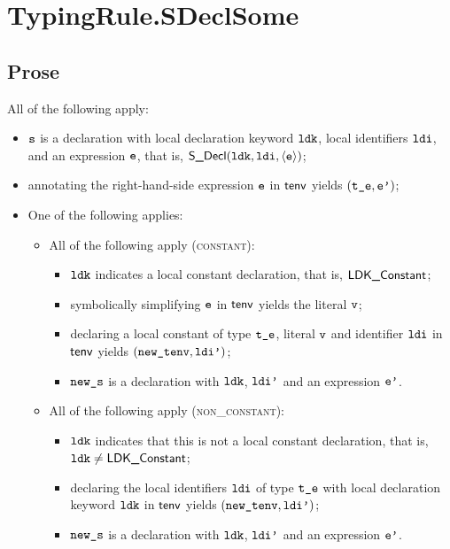 \documentclass{book}
\newcommand\ProseOrTypeError[0]{\ProseTerminateAs{\TypeErrorConfig}}
\begin{document}
\section{TypingRule.SDeclSome \label{sec:TypingRule.SDeclSome}}

\subsection{Prose}
All of the following apply:
\begin{itemize}
  \item $\texttt{s}$ is a declaration with local declaration keyword $\texttt{ldk}$, local identifiers $\texttt{ldi}$, and an expression $\texttt{e}$,
        that is, $\textsf{S\_Decl}(\texttt{ldk}, \texttt{ldi}, \langle\texttt{e}\rangle)$;
  \item annotating the right-hand-side expression $\texttt{e}$ in $\textsf{tenv}$ yields $(\texttt{t\_e},\texttt{e'})$\ProseOrTypeError;
  \item One of the following applies:
  \begin{itemize}
    \item All of the following apply (\textsc{constant}):
    \begin{itemize}
      \item $\texttt{ldk}$ indicates a local constant declaration, that is, $\textsf{LDK\_Constant}$;
      \item symbolically simplifying $\texttt{e}$ in $\textsf{tenv}$ yields the literal $\texttt{v}$\ProseOrTypeError;
      \item declaring a local constant of type $\texttt{t\_e}$, literal $\texttt{v}$ and identifier $\texttt{ldi}$ in $\textsf{tenv}$ yields $(\texttt{new\_tenv}, \texttt{ldi'})$;
      \item $\texttt{new\_s}$ is a declaration with $\texttt{ldk}$, $\texttt{ldi'}$ and an expression $\texttt{e'}$.
    \end{itemize}

    \item All of the following apply (\textsc{non\_constant}):
    \begin{itemize}
      \item $\texttt{ldk}$ indicates that this is not a local constant declaration, that is, $\texttt{ldk}\neq\textsf{LDK\_Constant}$;
      \item declaring the local identifiers $\texttt{ldi}$ of type $\texttt{t\_e}$ with local declaration keyword $\texttt{ldk}$ in $\textsf{tenv}$
            yields $(\texttt{new\_tenv}, \texttt{ldi'})$;
      \item $\texttt{new\_s}$ is a declaration with $\texttt{ldk}$, $\texttt{ldi'}$ and an expression $\texttt{e'}$.
    \end{itemize}
  \end{itemize}
\end{itemize}
\end{document}
